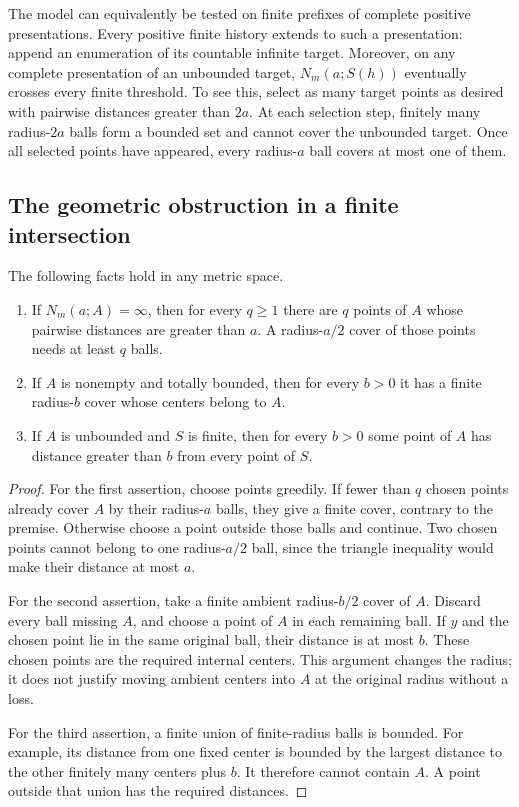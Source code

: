 The model can equivalently be tested on finite prefixes of complete positive
presentations. Every positive finite history extends to such a presentation:
append an enumeration of its countable infinite target. Moreover, on any
complete presentation of an unbounded target, $N_m(a;S(h))$ eventually
crosses every finite threshold. To see this, select as many target points
as desired with pairwise distances greater than $2a$. At each selection
step, finitely many radius-$2a$ balls form a bounded set and cannot cover
the unbounded target. Once all selected points have appeared, every
radius-$a$ ball covers at most one of them.

\subsection{The geometric obstruction in a finite intersection}

\begin{lemma}
\label{mt:packing}
The following facts hold in any metric space.
\begin{enumerate}
\item If $N_m(a;A)=\infty$, then for every $q\ge1$ there are $q$ points
of $A$ whose pairwise distances are greater than $a$. A radius-$a/2$
cover of those points needs at least $q$ balls.
\item If $A$ is nonempty and totally bounded, then for every $b>0$ it
has a finite radius-$b$ cover whose centers belong to $A$.
\item If $A$ is unbounded and $S$ is finite, then for every $b>0$ some
point of $A$ has distance greater than $b$ from every point of $S$.
\end{enumerate}
\end{lemma}
\begin{proof}
For the first assertion, choose points greedily. If fewer than $q$ chosen
points already cover $A$ by their radius-$a$ balls, they give a finite
cover, contrary to the premise. Otherwise choose a point outside those
balls and continue. Two chosen points cannot belong to one radius-$a/2$
ball, since the triangle inequality would make their distance at most $a$.

For the second assertion, take a finite ambient radius-$b/2$ cover of $A$.
Discard every ball missing $A$, and choose a point of $A$ in each remaining
ball. If $y$ and the chosen point lie in the same original ball, their
distance is at most $b$. These chosen points are the required internal
centers. This argument changes the radius; it does not justify moving
ambient centers into $A$ at the original radius without a loss.

For the third assertion, a finite union of finite-radius balls is bounded.
For example, its distance from one fixed center is bounded by the largest
distance to the other finitely many centers plus $b$. It therefore cannot
contain $A$. A point outside that union has the required distances.
\end{proof}

